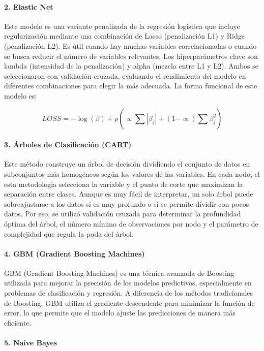 \documentclass[12pt,a4paper,onecolumn]{article}
\begin{document}
\paragraph{2. Elastic Net}

Este modelo es una variante penalizada de la regresión logística que incluye regularización mediante una combinación de Lasso (penalización L1) y Ridge (penalización L2). Es útil cuando hay muchas variables correlacionadas o cuando se busca reducir el número de variables relevantes. Los hiperparámetros clave son lambda (intensidad de la penalización) y alpha (mezcla entre L1 y L2). Ambos se seleccionaron con validación cruzada, evaluando el rendimiento del modelo en diferentes combinaciones para elegir la más adecuada. La forma funcional de este modelo es:

$$LOSS = - \log(\beta) + \rho( \propto \sum_{}^{}\left| \beta_{j} \right| + (1 - \propto )\sum_{}^{}\beta_{j}^{2})$$

\paragraph{3. Árboles de Clasificación (CART)}

Este método construye un árbol de decisión dividiendo el conjunto de datos en subconjuntos más homogéneos según los valores de las variables. En cada nodo, el esta metodologia selecciona la variable y el punto de corte que maximizan la separación entre clases. Aunque es muy fácil de interpretar, un solo árbol puede sobreajustarse a los datos si es muy profundo o si se permite dividir con pocos datos. Por eso, se utilizó validación cruzada para determinar la profundidad óptima del árbol, el número mínimo de observaciones por nodo y el parámetro de complejidad que regula la poda del árbol.

\paragraph{4. GBM (Gradient Boosting Machines)}

GBM (Gradient Boosting Machines) es una técnica avanzada de Boosting utilizada para mejorar la precisión de los modelos predictivos, especialmente en problemas de clasificación y regresión. A diferencia de los métodos tradicionales de Boosting, GBM utiliza el gradiente descendente para minimizar la función de error, lo que permite que el modelo ajuste las predicciones de manera más eficiente.

\paragraph{5. Naive Bayes}
\end{document}
